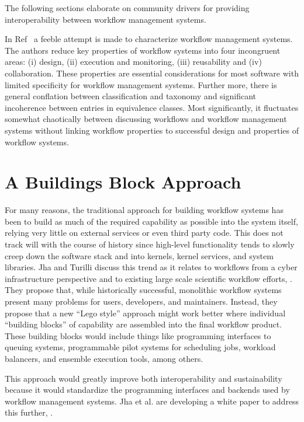 The following sections elaborate on community drivers for providing
interoperability between workflow management systems.


In Ref~\cite{deelman-fgcs} a feeble attempt is made to characterize workflow
management systems. The authors reduce key properties of workflow systems into
four incongruent areas: (i) design, (ii) execution and monitoring, (iii)
reusability and (iv) collaboration. These properties are essential
considerations for most  software with limited specificity for workflow
management systems. Further more, there is general conflation between
classification and taxonomy and significant incoherence between entries in
equivalence classes. Most significantly, it fluctuates somewhat chaotically
between discussing workflows and workflow management systems without linking
workflow properties to successful design and properties of workflow systems.





\section{A Buildings Block Approach}\label{a-buildings-block-approach}

For many reasons, the traditional approach for building workflow systems
has been to build as much of the required capability as possible into
the system itself, relying very little on external services or even
third party code. This does not track will with the course of history
since high-level functionality tends to slowly creep down the
software stack and into kernels, kernel services, and system libraries. Jha and
Turilli discuss this trend as it relates to workflows from a cyber
infrastructure perspective and to existing large scale scientific
workflow efforts, \cite{jha_building_2016}. They propose that, while historically
successful, monolithic workflow systems present many problems for users,
developers, and maintainers. Instead, they propose that a new ``Lego
style'' approach might work better where individual ``building blocks''
of capability are assembled into the final workflow product. These
building blocks would include things like programming interfaces to
queuing systems, programmable pilot systems for scheduling jobs,
workload balancers, and ensemble execution tools, among others.

This approach would greatly improve both interoperability and sustainability
because it would standardize the programming interfaces and backends used by
workflow management systems. Jha et al. are developing a white paper to address
this further, \cite{jha_towards_2016}.

